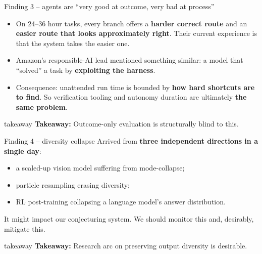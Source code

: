 \documentclass[aspectratio=169,11pt]{beamer}
\newcommand{\takeaway}[1]{%
  \vfill
  \begin{beamercolorbox}[wd=\textwidth,sep=0.45em]{takeaway}
    \small\textbf{Takeaway:} #1
  \end{beamercolorbox}%
}
\begin{document}
\begin{frame}{Finding 3 -- agents are ``very good at outcome, very bad at process''}
  \begin{itemize}\setlength\itemsep{0.55em}
    \item On 24--36 hour tasks, every branch offers a \textbf{harder correct route} and an \textbf{easier route that looks approximately right}. Their current experience is that the system takes the easier one.
    \item Amazon's responsible-AI lead mentioned something similar: a model that ``solved'' a task by \textbf{exploiting the harness}.
    \item Consequence: unattended run time is bounded by \textbf{how hard shortcuts are to find}. So verification tooling and autonomy duration are ultimately \textbf{the same problem}.
  \end{itemize}
  \takeaway{Outcome-only evaluation is structurally blind to this.}
\end{frame}

\begin{frame}{Finding 4 -- diversity collapse}
  Arrived from \textbf{three independent directions in a single day}:
  \begin{itemize}\setlength\itemsep{0.4em}
    \item a scaled-up vision model suffering from mode-collapse;
    \item particle resampling erasing diversity;
    \item RL post-training collapsing a language model's answer distribution.
  \end{itemize}
  \vspace{0.5em}
  It might impact our conjecturing system. We should monitor this and, desirably, mitigate this.
  \takeaway{Research arc on preserving output diversity is desirable.}
\end{frame}
\end{document}
